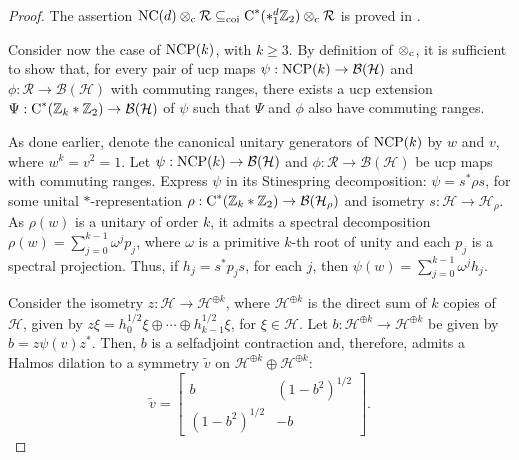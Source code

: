 \documentclass{amsart}
\theoremstyle{definition}
\theoremstyle{remark}
\newcommand{\B}{\mathcal{B}}
\renewcommand{\H}{\mathcal{H}}
\newcommand\cstar{{\textrm C}^*}                              %
\numberwithin{equation}{section}
\begin{document}
\begin{proof}
The assertion $\mbox{\textrm{NC}}(d)\otimes_{\textrm c}\mathcal R\subseteq_{\textrm{coi}}\cstar(*_1^d \mathbb Z_2)\otimes_{\textrm c}\mathcal R$ is proved in
\cite[Lemma 7.2]{farenick--kavruk--paulsen--todorov2014}.

Consider now the case of $\mbox{\textrm{NCP}}(k)$, with $k\geq 3$.
By definition of $\otimes_{\textrm c}$, it is sufficient to show that, for every pair of ucp maps 
$\psi : \mbox{\textrm{NCP}}(k)\rightarrow\B(\H)$ and	
$\phi : \mathcal R\rightarrow\B(\H)$ with commuting ranges, there exists a ucp extension 
$\Psi : \cstar(\mathbb Z_k\ast \mathbb Z_2)\rightarrow\B(\H)$ of $\psi$ such that $\Psi$ and $\phi$ also have commuting ranges.

As done earlier, denote the canonical unitary generators of $\mbox{\textrm{NCP}}(k)$ by $w$ and $v$, where $w^k=v^2=1$. Let
$\psi : \mbox{\textrm{NCP}}(k)\rightarrow\B(\H)$ and	
$\phi : \mathcal R\rightarrow\B(\H)$ be ucp maps with commuting ranges.
Express $\psi$ in its Stinespring decomposition: $\psi=s^*\rho s$, for some unital $*$-representation
$\rho:\cstar(\mathbb Z_k * \mathbb Z_2)\rightarrow\B(\H_\rho)$ and isometry $s:\H\rightarrow\H_\rho$. As $\rho(w)$ is a unitary of order
$k$, it admits a spectral decomposition $\rho(w)=\displaystyle\sum_{j=0}^{k-1}\omega^j p_j$, where $\omega$ is a primitive $k$-th root of
unity and each $p_j$ is a spectral projection. Thus, if $h_j=s^*p_js$, for each $j$, then
$\displaystyle\psi(w)=\sum_{j=0}^{k-1} \omega^j h_j$.

Consider the isometry $z:\H\rightarrow\H^{\oplus k}$, where $\H^{\oplus k}$ is the direct sum of $k$ copies of $\H$, given by 
$z\xi=h_0^{1/2}\xi\oplus\cdots\oplus h_{k-1}^{1/2}\xi$, for $\xi\in\H$. Let $b:\H^{\oplus k}\rightarrow\H^{\oplus k}$ be given by $b=z\psi(v)z^*$. 
Then, $b$ is a selfadjoint contraction and, therefore, admits a Halmos dilation to a symmetry $\tilde v$ on $\H^{\oplus k}\oplus\H^{\oplus k}$:
\[
\tilde v = \left[ \begin{array}{cc} b & (1-b^2)^{1/2} \\ (1-b^2)^{1/2} & -b \end{array}\right].
\]


\end{proof}
\end{document}
